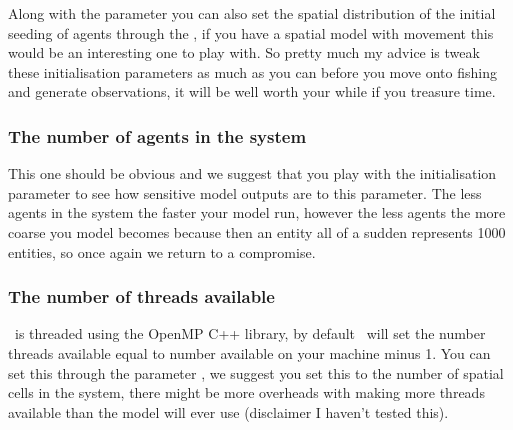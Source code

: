 Along with the  parameter you can also set the spatial distribution of the initial seeding of agents through the , if you have a spatial model with movement this would be an interesting one to play with. So pretty much my advice is tweak these initialisation parameters as much as you can before you move onto fishing and generate observations, it will be well worth your while if you treasure time.

\subsubsection*{The number of agents in the system} 
This one should be obvious and we suggest that you play with the initialisation parameter  to see how sensitive model outputs are to this parameter. The less agents in the system the faster your model run, however the less agents the more coarse you model becomes because then an entity all of a sudden represents 1000 entities, so once again we return to a compromise.

\subsubsection*{The number of threads available} 
\IBM\ is threaded using the OpenMP C++ library, by default \IBM\ will set the number threads available equal to number available on your machine minus 1. You can set this through the  parameter , we suggest you set this to the number of spatial cells in the system, there might be more overheads with making more threads available than the model will ever use (disclaimer I haven't tested this). 



